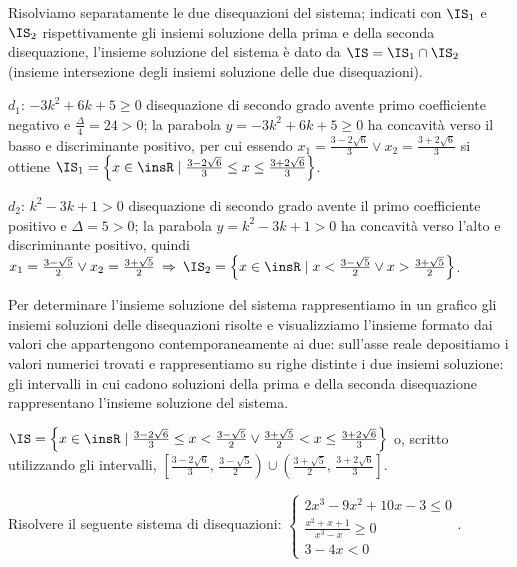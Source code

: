 Risolviamo separatamente le due disequazioni del sistema; indicati con $\IS_1$ e $\IS_2$ rispettivamente gli insiemi soluzione della prima e della seconda disequazione, l'insieme soluzione del sistema è dato da $\IS=\IS_1\cap \IS_2$ (insieme intersezione degli insiemi soluzione delle due disequazioni).
\begin{itemize*}
\item $d_1$: $-3k^2+6k+5\ge 0$ disequazione di secondo grado avente primo coefficiente negativo e $\frac{\Delta} 4=24>0$; la parabola $y=-3k^2+6k+5\ge 0$ ha concavità verso il basso e discriminante positivo, per cui essendo $x_1=\frac{3-2\sqrt 6} 3\vee x_2=\frac{3+2\sqrt 6} 3$ si ottiene $\IS_1=\left\{x\in \insR \mid \frac{3-2\sqrt 6} 3\le x\le \frac{3+2\sqrt 6} 3\right\}$.
\item $d_2$: $k^2-3k+1>0$ disequazione di secondo grado avente il primo coefficiente positivo e $\Delta =5>0$; la parabola $y=k^2-3k+1>0$ ha concavità verso l'alto e discriminante positivo, quindi $x_1=\frac{3-\sqrt 5} 2\vee x_2=\frac{3+\sqrt 5} 2 \:\Rightarrow\: \IS_2=\left\{x\in \insR \mid x<\frac{3-\sqrt 5} 2\vee x>\frac{3+\sqrt 5} 2\right\}$.
\end{itemize*}
Per determinare l'insieme soluzione del sistema rappresentiamo in un grafico gli insiemi soluzioni delle disequazioni risolte e visualizziamo l'insieme formato dai valori che appartengono contemporaneamente ai due: sull'asse reale depositiamo i valori numerici trovati e rappresentiamo su righe distinte i due insiemi soluzione: gli intervalli in cui cadono soluzioni della prima e della seconda disequazione rappresentano l'insieme soluzione del sistema.
\begin{center}
 
\end{center}
 $\IS=\left\{x\in \insR\mid\frac{3-2\sqrt 6} 3\le x<\frac{3-\sqrt 5} 2\vee \frac{3+\sqrt 5} 2<x\le \frac{3+2\sqrt 6} 3\right\}$ o, scritto utilizzando gli intervalli, $\left[\frac{3-2\sqrt 6} 3\text{, }\frac{3-\sqrt 5} 2\right)\cup \left(\frac{3+\sqrt 5} 2\text{, }\frac{3+2\sqrt 6} 3\right]$.

\begin{problema}
Risolvere il seguente sistema di disequazioni: $\left\{\begin{array}{l}2x^3-9x^2+10x-3\le 0\\ \frac{x^2+x+1}{\ x^3-x}\ge 0 \\3-4x<0 \end{array}\right.$.
\end{problema}

